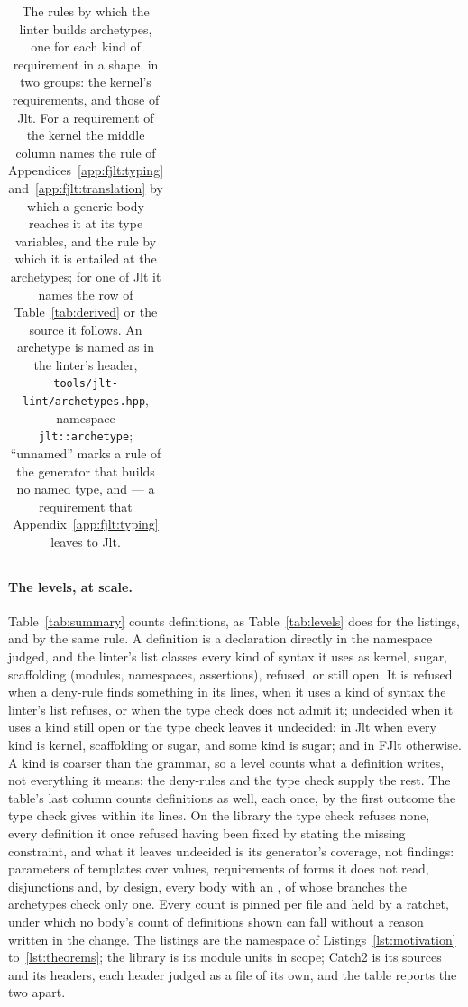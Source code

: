 \begin{table}[htbp]
\begin{tabularx}{\linewidth}{@{}>{\raggedright\arraybackslash}p{0.34\linewidth}>{\raggedright\arraybackslash}p{0.3\linewidth}>{\raggedright\arraybackslash}X@{}}
\bottomrule
\end{tabularx}
\caption{The rules by which the linter builds archetypes, one for each kind of requirement in a shape, in two groups: the kernel's requirements, and those of Jlt.
For a requirement of the kernel the middle column names the rule of Appendices~\ref{app:fjlt:typing} and~\ref{app:fjlt:translation} by which a generic body reaches it at its type variables, and the rule by which it is entailed at the archetypes; for one of Jlt it names the row of Table~\ref{tab:derived} or the source it follows.
An archetype is named as in the linter's header, \texttt{tools/jlt-lint/archetypes.hpp}, namespace \texttt{jlt::archetype}; ``unnamed'' marks a rule of the generator that builds no named type, and --- a requirement that Appendix~\ref{app:fjlt:typing} leaves to Jlt.}
\label{tab:archetype-rules}
\end{table}

\paragraph{The levels, at scale.}
\label{app:lint:summary}
Table~\ref{tab:summary} counts definitions, as Table~\ref{tab:levels} does for the listings, and by the same rule.
A definition is a declaration directly in the namespace judged, and the linter's list classes every kind of syntax it uses as kernel, sugar, scaffolding (modules, namespaces, assertions), refused, or still open.
It is refused when a deny-rule finds something in its lines, when it uses a kind of syntax the linter's list refuses, or when the type check does not admit it; undecided when it uses a kind still open or the type check leaves it undecided; in Jlt when every kind is kernel, scaffolding or sugar, and some kind is sugar; and in FJlt otherwise.
A kind is coarser than the grammar, so a level counts what a definition writes, not everything it means: the deny-rules and the type check supply the rest.
The table's last column counts definitions as well, each once, by the first outcome the type check gives within its lines.
On the library the type check refuses none, every definition it once refused having been fixed by stating the missing constraint, and what it leaves undecided is its generator's coverage, not findings: parameters of templates over values, requirements of forms it does not read, disjunctions and, by design, every body with an , of whose branches the archetypes check only one.
Every count is pinned per file and held by a ratchet, under which no body's count of definitions shown can fall without a reason written in the change.
The listings are the namespace of Listings~\ref{lst:motivation} to~\ref{lst:theorems}; the library is its module units in scope; Catch2 is its sources and its headers, each header judged as a file of its own, and the table reports the two apart.

